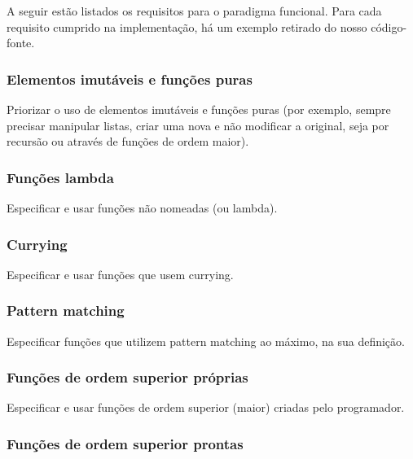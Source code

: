 \documentclass[rel_mlp]{iiufrgs}
\begin{document}
A seguir estão listados os requisitos para o paradigma funcional. Para cada requisito cumprido na implementação, há um exemplo retirado do nosso código-fonte.


\subsubsection{Elementos imutáveis e funções puras}

Priorizar o uso de elementos imutáveis e funções puras (por exemplo, sempre precisar manipular listas, criar uma nova e não modificar a original, seja por recursão ou através de funções de ordem maior).


\subsubsection{Funções lambda}

Especificar e usar funções não nomeadas (ou lambda).


\subsubsection{Currying}

Especificar e usar funções que usem currying.


\subsubsection{Pattern matching}

Especificar funções que utilizem pattern matching ao máximo, na sua definição.


\subsubsection{Funções de ordem superior próprias}

Especificar e usar funções de ordem superior (maior) criadas pelo programador.


\subsubsection{Funções de ordem superior prontas}
\end{document}
